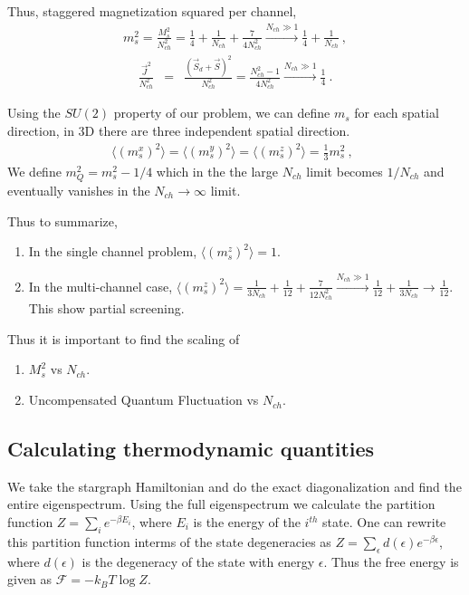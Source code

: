 \documentclass[reprint,prb,superscriptaddress]{revtex4-1}
\begin{document}
\noindent Thus, staggered magnetization squared per channel,
\begin{eqnarray}
m_s^2=\frac{M_s^2}{N_{ch}^2}=\frac{1}{4}+\frac{1}{N_{ch}}+\frac{7}{4N_{ch}^2} \xrightarrow[]{N_{ch}\gg 1} \frac{1}{4}+\frac{1}{N_{ch}}~,
\end{eqnarray}
\begin{eqnarray}
\frac{\vec{J}^2}{N_{ch}^2}&=&\frac{(\vec{S}_d+\vec{S})^2}{N_{ch}^2}= \frac{N^2_{ch}-1}{4N^2_{ch}} \xrightarrow[]{N_{ch}\gg 1} \frac{1}{4}~. \nonumber 
\end{eqnarray}

Using the $SU(2)$ property of our problem, we can define $m_s$ for each spatial direction, in 3D there are three independent spatial direction.
\begin{eqnarray}
\langle(m_s^x)^2\rangle=\langle(m_s^y)^2\rangle=\langle(m_s^z)^2\rangle=\frac{1}{3}m_s^2~,~~   
\end{eqnarray}
We define $m_Q^2=m_s^2-1/4$ which in the the large $N_{ch}$ limit becomes $1/N_{ch}$ and eventually vanishes in the $N_{ch}\rightarrow \infty$ limit. 


\noindent Thus to summarize,
\begin{enumerate}
\item In the single channel problem, $\langle (m_s^z)^2 \rangle=1$. 
\item In the multi-channel case,  
$\langle (m_s^z)^2 \rangle=\frac{1}{3N_{ch}}+\frac{1}{12}+\frac{7}{12N_{ch}^2} \xrightarrow[]{N_{ch}\gg 1} \frac{1}{12}+\frac{1}{3N_{ch}}\rightarrow \frac{1}{12}$. 
This show partial screening.
\end{enumerate}

Thus it is important to find the scaling of 

\begin{enumerate}
\item $M_s^2$ vs $N_{ch}$.
\item Uncompensated Quantum Fluctuation vs $N_{ch}$.
\end{enumerate}

\subsection{Calculating thermodynamic quantities}
We take the stargraph Hamiltonian and do the exact diagonalization and find the entire eigenspectrum. Using the full eigenspectrum we calculate the partition function $Z=\sum_i e^{-\beta E_i}$, where $E_i$ is the energy of the $i^{th}$ state. One can rewrite this partition function interms of the state degeneracies as $Z=\sum_{\epsilon} d(\epsilon) e^{-\beta \epsilon} $, where $d(\epsilon)$ is the degeneracy of the state with energy $\epsilon$. Thus the free energy is given as $\mathcal{F}=-k_BT\log Z$. 
\end{document}
